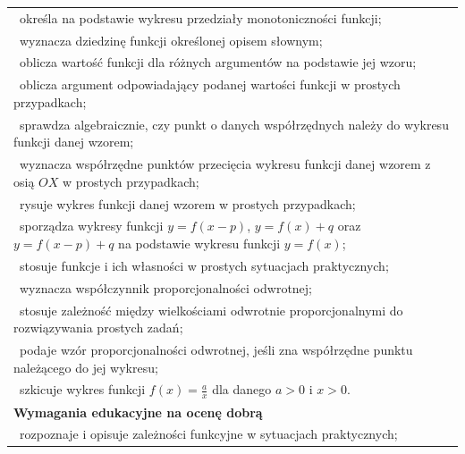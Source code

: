 \documentclass[12pt,a4paper]{article}
\begin{document}
\begin{longtable}{|p{16cm}|}
		\textbullet\ określa na podstawie wykresu przedziały monotoniczności funkcji; \\
		
		\textbullet\ wyznacza dziedzinę funkcji określonej opisem słownym; \\
		
		\textbullet\ oblicza wartość funkcji dla różnych argumentów na podstawie jej wzoru; \\
		
		\textbullet\ oblicza argument odpowiadający podanej wartości funkcji w prostych przypadkach; \\
		
		\textbullet\ sprawdza algebraicznie, czy punkt o danych współrzędnych należy do wykresu funkcji danej wzorem; \\
		
		\textbullet\ wyznacza współrzędne punktów przecięcia wykresu funkcji danej wzorem z osią $OX$ w prostych przypadkach; \\
		
		\textbullet\ rysuje wykres funkcji danej wzorem w prostych przypadkach; \\
		
		\textbullet\ sporządza wykresy funkcji $y=f(x-p)$, $y=f(x)+q$ oraz $y=f(x-p)+q$ na podstawie wykresu funkcji $y=f(x)$; \\
		
		\textbullet\ stosuje funkcje i ich własności w prostych sytuacjach praktycznych; \\
		
		\textbullet\ wyznacza współczynnik proporcjonalności odwrotnej; \\
		
		\textbullet\ stosuje zależność między wielkościami odwrotnie proporcjonalnymi do rozwiązywania prostych zadań; \\
		
		\textbullet\ podaje wzór proporcjonalności odwrotnej, jeśli zna współrzędne punktu należącego do jej wykresu; \\
		
		\textbullet\ szkicuje wykres funkcji $f(x)=\frac{a}{x}$ dla danego $a>0$ i $x>0$. \\ \hline
		
		\textbf{Wymagania edukacyjne na ocenę dobrą} \\ \hline
		
		\textbullet\ rozpoznaje i opisuje zależności funkcyjne w sytuacjach praktycznych; \\
		

\end{longtable}
\end{document}
